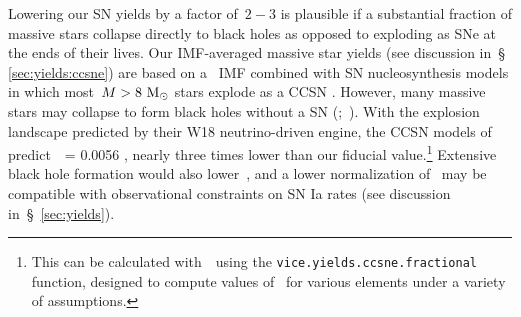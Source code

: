\documentclass[ms.tex]{subfiles}
\begin{document}
\par
Lowering our SN yields by a factor of~$2 - 3$ is plausible if a substantial
fraction of massive stars collapse directly to black holes as opposed to
exploding as SNe at the ends of their lives.
Our IMF-averaged massive star yields (see discussion in~\S
\ref{sec:yields:ccsne}) are based on a~\citet{Kroupa2001} IMF combined with SN
nucleosynthesis models in which most~$M > 8~\text{M}_\odot$ stars explode as a CCSN
\cite[e.g.][]{Woosley1995, Chieffi2004, Chieffi2013, Limongi2018, Nomoto2013}.
However, many massive stars may collapse to form black holes without a SN
(\citealp*{Pejcha2015, Gerke2015};~\citealp{Sukhbold2016, Ertl2016, Adams2017,
Basinger2021, Neustadt2021}).
With the explosion landscape predicted by their W18 neutrino-driven engine, the
CCSN models of~\citet{Sukhbold2016} predict~~= 0.0056
\citep{Griffith2021a}, nearly three times lower than our fiducial
value.\footnote{
	This can be calculated with~\vice~using the
	\texttt{vice.yields.ccsne.fractional} function, designed to compute values
	of~ for various elements under a variety of assumptions.
}
Extensive black hole formation would also lower~, and a lower
normalization of~ may be compatible with observational constraints on
SN Ia rates (see discussion in~\S~\ref{sec:yields}).
\end{document}
